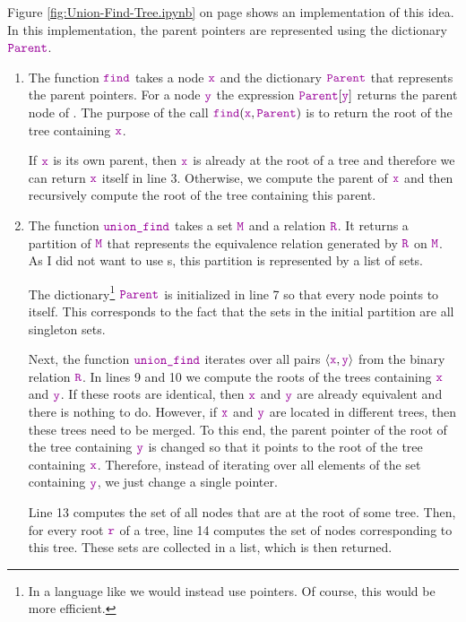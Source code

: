 Figure \ref{fig:Union-Find-Tree.ipynb} on page \pageref{fig:Union-Find-Tree.ipynb} shows an
implementation of this idea.  In this implementation, the parent pointers are represented using the
dictionary $\mytt{Parent}$.  
\begin{enumerate}
\item The function $\mytt{find}$ takes a node $\mytt{x}$ and the dictionary $\mytt{Parent}$ 
      that represents the parent pointers.  For a node $\mytt{y}$ the expression
      $\mytt{Parent}[\mytt{y}]$ returns the parent node of .
      The purpose of the call $\mytt{find}(\mytt{x}, \mytt{Parent})$ is to
      return the root of the tree containing $\mytt{x}$.

      If $\mytt{x}$ is its own parent, then $\mytt{x}$ is already at the root of a tree and therefore 
      we can return $\mytt{x}$ itself in line 3.
      Otherwise, we compute the parent of $\mytt{x}$ and then recursively compute the root of the tree
      containing this parent.  
\item The function $\mytt{union\_find}$ takes a set $\mytt{M}$ and a relation $\mytt{R}$.  It returns
      a partition of $\mytt{M}$ that represents the equivalence relation generated by $\mytt{R}$ on
      $\mytt{M}$.  As I did not want to use s, this partition is represented by a list of
      sets. 

      The dictionary\footnote{
        In a language like  we would instead use pointers.  Of course, this would be more efficient.
      } $\mytt{Parent}$ is initialized in line 7 so that every node
      points to itself.   This corresponds to the fact that the sets in the initial partition are all
      singleton sets.  

      Next, the function $\mytt{union\_find}$ iterates over all pairs $\langle\mytt{x}, \mytt{y}\rangle$ from the binary
      relation $\mytt{R}$.  In lines 9 and 10 we compute the roots of the trees containing $\mytt{x}$ and
      $\mytt{y}$.  If these roots are identical, then $\mytt{x}$ and $\mytt{y}$ are already
      equivalent and there is nothing to do.  However, if $\mytt{x}$ and $\mytt{y}$ are located 
      in different trees, then these trees need to be merged.  To this end, the parent pointer of
      the root of the tree containing $\mytt{y}$ is changed so that it 
      points to the root of the tree containing $\mytt{x}$.  Therefore, instead of iterating over all
      elements of the set containing $\mytt{y}$, we just change a single pointer.

      Line 13 computes the set of all nodes that are at the root of some tree.  Then, for every root
      $\mytt{r}$ of a tree, line 14 computes the set of nodes corresponding to this tree.
      These sets are collected in a list, which is then returned.
\end{enumerate}

